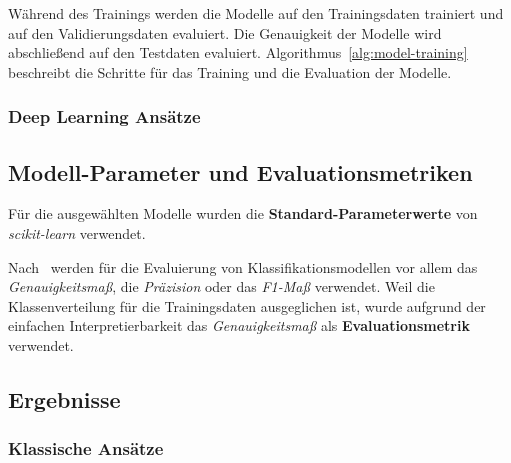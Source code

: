 Während des Trainings werden die Modelle auf den Trainingsdaten trainiert und auf den Validierungsdaten evaluiert.
Die Genauigkeit der Modelle wird abschließend auf den Testdaten evaluiert.
Algorithmus~\ref{alg:model-training} beschreibt die Schritte für das Training und die Evaluation der Modelle.

\subsubsection{Deep Learning Ansätze} \label{sec:deep-learning-ansaetze}

\subsection{Modell-Parameter und Evaluationsmetriken}

Für die ausgewählten Modelle wurden die \textbf{Standard-Parameterwerte} von \textit{scikit-learn} verwendet.

Nach~\cite{wankhade2022survey} werden für die Evaluierung von Klassifikationsmodellen vor allem das \textit{Genauigkeitsmaß}, die \textit{Präzision} oder das \textit{F1-Maß} verwendet.
Weil die Klassenverteilung für die Trainingsdaten ausgeglichen ist, wurde aufgrund der einfachen Interpretierbarkeit das \textit{Genauigkeitsmaß} als \textbf{Evaluationsmetrik} verwendet.

\subsection{Ergebnisse}

\subsubsection{Klassische Ansätze}

